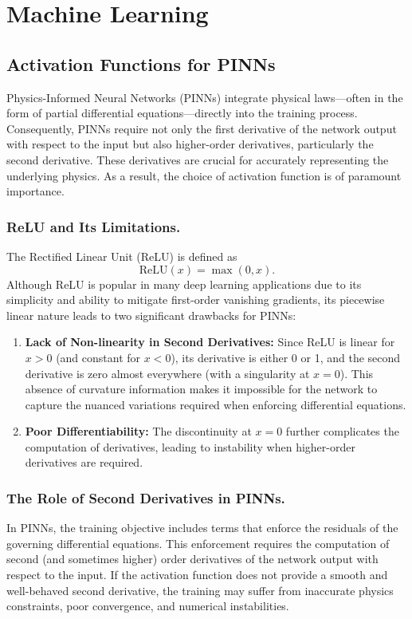 \graphicspath{{../results/figures/methods/}}
\chapter{Machine Learning}
\label{sec:theory}
\section{Activation Functions for PINNs}

Physics-Informed Neural Networks (PINNs) integrate physical laws—often in the form of partial differential equations—directly into the training process. Consequently, PINNs require not only the first derivative of the network output with respect to the input but also higher-order derivatives, particularly the second derivative. These derivatives are crucial for accurately representing the underlying physics. As a result, the choice of activation function is of paramount importance.

\subsection{ReLU and Its Limitations.}
The Rectified Linear Unit (ReLU) is defined as
\[
\text{ReLU}(x) = \max(0, x).
\]
Although ReLU is popular in many deep learning applications due to its simplicity and ability to mitigate first-order vanishing gradients, its piecewise linear nature leads to two significant drawbacks for PINNs:
\begin{enumerate}
    \item \textbf{Lack of Non-linearity in Second Derivatives:} Since ReLU is linear for \(x>0\) (and constant for \(x<0\)), its derivative is either 0 or 1, and the second derivative is zero almost everywhere (with a singularity at \(x=0\)). This absence of curvature information makes it impossible for the network to capture the nuanced variations required when enforcing differential equations.
    \item \textbf{Poor Differentiability:} The discontinuity at \(x=0\) further complicates the computation of derivatives, leading to instability when higher-order derivatives are required.
\end{enumerate}

\subsection{The Role of Second Derivatives in PINNs.}
In PINNs, the training objective includes terms that enforce the residuals of the governing differential equations. This enforcement requires the computation of second (and sometimes higher) order derivatives of the network output with respect to the input. If the activation function does not provide a smooth and well-behaved second derivative, the training may suffer from inaccurate physics constraints, poor convergence, and numerical instabilities.

